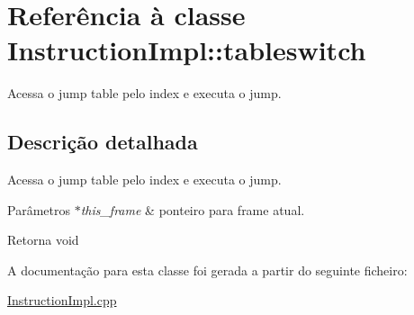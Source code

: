 \hypertarget{class_instruction_impl_1_1tableswitch}{}\section{Referência à classe Instruction\+Impl\+:\+:tableswitch}
\label{class_instruction_impl_1_1tableswitch}


Acessa o jump table pelo index e executa o jump.  




\subsection{Descrição detalhada}
Acessa o jump table pelo index e executa o jump. 


\begin{DoxyParams}{Parâmetros}
{\em $\ast$this\+\_\+frame} & ponteiro para frame atual. \\
\hline
\end{DoxyParams}
\begin{DoxyReturn}{Retorna}
void 
\end{DoxyReturn}


A documentação para esta classe foi gerada a partir do seguinte ficheiro\+:\begin{DoxyCompactItemize}
\item 
\hyperlink{_instruction_impl_8cpp}{Instruction\+Impl.\+cpp}\end{DoxyCompactItemize}
